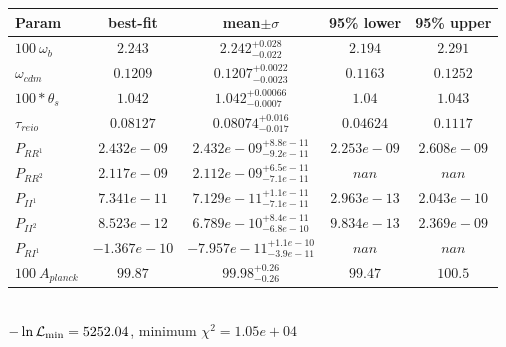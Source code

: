 \begin{tabular}{|l|c|c|c|c|} 
 \hline 
Param & best-fit & mean$\pm\sigma$ & 95\% lower & 95\% upper \\ \hline 
$100~\omega_{b }$ &$2.243$ & $2.242_{-0.022}^{+0.028}$ & $2.194$ & $2.291$ \\ 
$\omega_{cdm }$ &$0.1209$ & $0.1207_{-0.0023}^{+0.0022}$ & $0.1163$ & $0.1252$ \\ 
$100*\theta_{s }$ &$1.042$ & $1.042_{-0.0007}^{+0.00066}$ & $1.04$ & $1.043$ \\ 
$\tau_{reio }$ &$0.08127$ & $0.08074_{-0.017}^{+0.016}$ & $0.04624$ & $0.1117$ \\ 
$P_{{RR}^1 }$ &$2.432e-09$ & $2.432e-09_{-9.2e-11}^{+8.8e-11}$ & $2.253e-09$ & $2.608e-09$ \\ 
$P_{{RR}^2 }$ &$2.117e-09$ & $2.112e-09_{-7.1e-11}^{+6.5e-11}$ & $nan$ & $nan$ \\ 
$P_{{II}^1 }$ &$7.341e-11$ & $7.129e-11_{-7.1e-11}^{+1.1e-11}$ & $2.963e-13$ & $2.043e-10$ \\ 
$P_{{II}^2 }$ &$8.523e-12$ & $6.789e-10_{-6.8e-10}^{+8.4e-11}$ & $9.834e-13$ & $2.369e-09$ \\ 
$P_{{RI}^1 }$ &$-1.367e-10$ & $-7.957e-11_{-3.9e-11}^{+1.1e-10}$ & $nan$ & $nan$ \\ 
$100~A_{planck }$ &$99.87$ & $99.98_{-0.26}^{+0.26}$ & $99.47$ & $100.5$ \\ 
\hline 
 \end{tabular} \\ 
$-\ln{\cal L}_\mathrm{min} =5252.04$, minimum $\chi^2=1.05e+04$ \\ 
